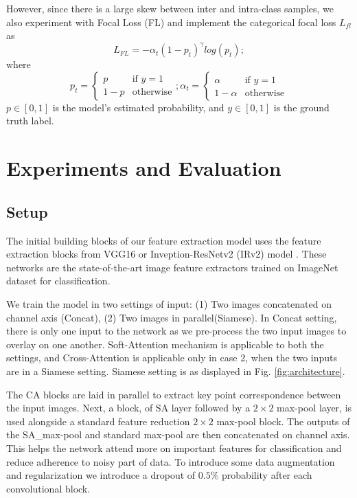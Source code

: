 \documentclass[a4paper,conference]{IEEEtran}
\begin{document}
However, since there is a large skew between inter and intra-class samples, we also experiment with Focal Loss (FL) \cite{lin_focal_2020} and implement the categorical focal loss $L_{fl}$ as
\begin{equation}
  \label{eq:focalloss}
    L_{FL} =  - \alpha_t (1-p_t)^{\gamma}log(p_t); 
\end{equation}
where \begin{equation*}
    p_t = 
    \begin{cases} 
        p & \text{if } y = 1 \\
        1-p & \text{otherwise}
    \end{cases};
     \alpha_t = 
    \begin{cases} 
        \alpha & \text{if } y = 1 \\
        1-\alpha & \text{otherwise}
    \end{cases}
\end{equation*}
 $p \in [0,1] $ is the model's estimated probability, and $y \in [0,1]$ is the ground truth label.
 
\section{Experiments and Evaluation}
\subsection{Setup}
The initial building blocks of our feature extraction model uses the feature extraction blocks from VGG16 \cite{vgg16} or Inveption-ResNetv2 (IRv2) model \cite{szegedy_inception-v4_2017}. These networks are the state-of-the-art image feature extractors trained on ImageNet \cite{imagenet} dataset for classification. 

We train the model in two settings of input: (1) Two images concatenated on channel axis (Concat), (2) Two images in parallel(Siamese).
In Concat setting, there is only one input to the network as we pre-process the two input images to overlay on one another. Soft-Attention mechanism is applicable to both the settings, and Cross-Attention is applicable only in case 2, when the two inputs are in a Siamese setting. Siamese setting is as displayed in Fig. \ref{fig:architecture}. 

The CA blocks are laid in parallel to extract key point correspondence between the input images. Next, a block, of SA layer followed by a $2 \times 2$ max-pool layer, is used alongside a standard feature reduction $2 \times 2$ max-pool block.
The outputs of the SA\_max-pool and standard max-pool are then concatenated on channel axis.
This helps the network attend more on important features for classification and reduce adherence to noisy part of data. 
To introduce some data augmentation and regularization we introduce a dropout of $0.5\%$ probability after each convolutional block.
\end{document}
